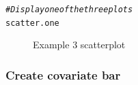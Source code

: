 \documentclass[letterpaper]{article}\usepackage[]{graphicx}\usepackage[]{color}
\makeatletter
\newcommand{\hlcom}[1]{\textcolor[rgb]{0.678,0.584,0.686}{\textit{#1}}}%
\newcommand{\hlstd}[1]{\textcolor[rgb]{0.345,0.345,0.345}{#1}}%
\newenvironment{kframe}{%
 \def\at@end@of@kframe{}%
 \ifinner\ifhmode%
  \def\at@end@of@kframe{\end{minipage}}%
  \begin{minipage}{\columnwidth}%
 \fi\fi%
 \def\FrameCommand##1{\hskip\@totalleftmargin \hskip-\fboxsep
 \colorbox{shadecolor}{##1}\hskip-\fboxsep
     \hskip-\linewidth \hskip-\@totalleftmargin \hskip\columnwidth}%
 \MakeFramed {\advance\hsize-\width
   \@totalleftmargin\z@ \linewidth\hsize
   \@setminipage}}%
 {\par\unskip\endMakeFramed%
 \at@end@of@kframe}
\newenvironment{knitrout}{}{} %
\makeatother
\begin{document}
\begin{knitrout}
\begin{kframe}
\begin{alltt}
\hlcom{# Display one of the three plots}
\hlstd{scatter.one}
\end{alltt}
\end{kframe}\begin{figure}[]


{\centering {} 

}

\caption[Example 3 scatterplot]{Example 3 scatterplot\label{fig:multiplotex3_scatter}}
\end{figure}


\end{knitrout}

\subsubsection{Create covariate bar}
\end{document}

